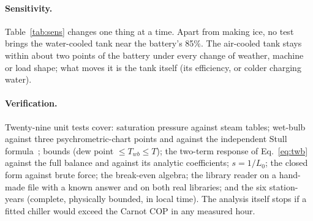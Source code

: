 \documentclass[10pt,a4paper]{article}
\begin{document}
\paragraph{Sensitivity.} Table~\ref{tab:sens} changes one thing at a time. Apart from making ice, no test brings the
water-cooled tank near the battery's 85\%. The air-cooled tank stays within about two points of the battery under every
change of weather, machine or load shape; what moves it is the tank itself (its efficiency, or colder charging water).

\begin{table}[h]\centering\small

\caption{One-at-a-time sensitivity. Two numbers are the two cases named in the row; one number is the changed case.}
\label{tab:sens}
\end{table}

\paragraph{Verification.} Twenty-nine unit tests cover: saturation pressure against steam tables; wet-bulb against
three psychrometric-chart points and against the independent Stull formula~\cite{stull}; bounds (dew point
$\le T_{wb}\le T$); the two-term response of Eq.~\eqref{eq:twb} against the full balance and against its analytic
coefficients; $s=1/L_0$; the closed form against brute force; the break-even algebra; the library reader on a
hand-made file with a known answer and on both real libraries; and the six station-years (complete, physically
bounded, in local time). The analysis itself stops if a fitted chiller would exceed the Carnot COP in any measured
hour.
\end{document}
